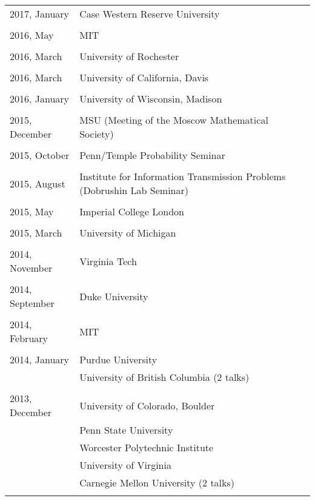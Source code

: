 \documentclass[letterpaper,11pt]{article}
\begin{document}
\begin{longtable}{llc}
  2017, January
  & Case Western Reserve University
	\\\\
  2016, May
  & MIT
  \\\\
  2016, March
  & University of Rochester
  \\\\
  2016, March
  & University of California, Davis
  \\\\
  2016, January
  & University of Wisconsin, Madison
  \\\\   
  2015, December
  & MSU (Meeting of the Moscow Mathematical Society)
  \\\\   
  2015, October
  & Penn/Temple Probability Seminar
  \\\\   

  2015, August
  & Institute for Information Transmission Problems
  (Dobrushin Lab Seminar)
  \\\\ 

  2015, May
  & Imperial College London
  \\\\

  2015, March
  & University of Michigan
  \\\\

  2014, November
  & Virginia Tech\\\\

  2014, September
  & Duke University\\\\

  2014, February
  & MIT\\\\

  2014, January 
  & Purdue University &\hspace{110pt}
  \\& University of British Columbia (2 talks)\\\\
  
  2013, December
  & University of Colorado, Boulder
  \\&Penn State University\\&Worcester Polytechnic Institute
  \\&University of Virginia\\&
  Carnegie Mellon University (2 talks)\\\\
  

\end{longtable}
\end{document}
